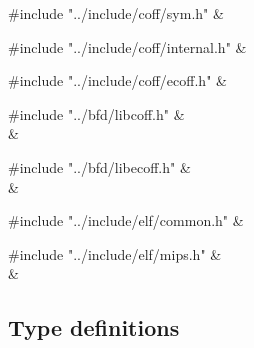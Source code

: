 \medskip
\begin{cxreftabi}
{\stt \#include "../include/coff/sym.h"} &\\
\end{cxreftabi}

\medskip
\begin{cxreftabi}
{\stt \#include "../include/coff/internal.h"} &\\
\end{cxreftabi}

\medskip
\begin{cxreftabi}
{\stt \#include "../include/coff/ecoff.h"} &\\
\end{cxreftabi}

\medskip
\begin{cxreftabi}
{\stt \#include "../bfd/libcoff.h"} &\\
\hspace*{0.2in}{\stt \#include "../include/bfdlink.h"} &\\
\end{cxreftabi}

\medskip
\begin{cxreftabi}
{\stt \#include "../bfd/libecoff.h"} &\\
\hspace*{0.2in}{\stt \#include "../include/bfdlink.h"} &\\
\end{cxreftabi}

\medskip
\begin{cxreftabi}
{\stt \#include "../include/elf/common.h"} &\\
\end{cxreftabi}

\medskip
\begin{cxreftabi}
{\stt \#include "../include/elf/mips.h"} &\\
\hspace*{0.2in}{\stt \#include "../include/elf/reloc-macros.h"} &\\
\end{cxreftabi}


\subsection{Type definitions}


